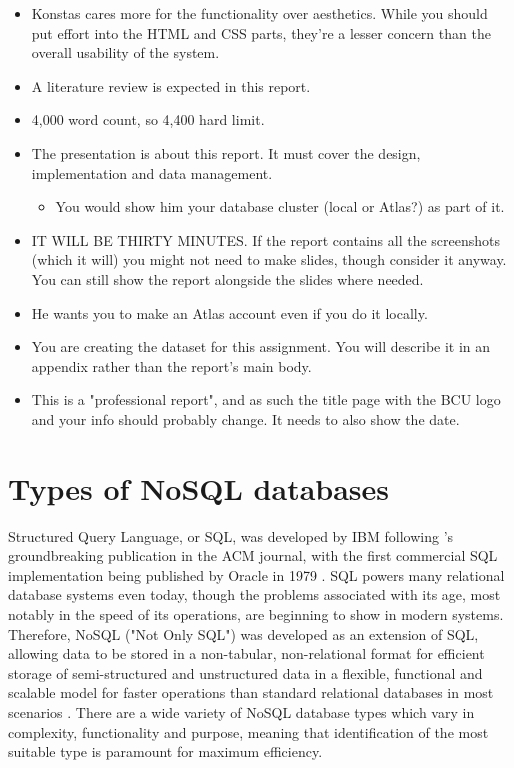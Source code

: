 \documentclass[12pt]{report}
\begin{document}
\begin{itemize}
    \item Konstas cares more for the functionality over aesthetics. While you should put effort into 
    the HTML and CSS parts, they're a lesser concern than the overall usability of the system.
    \item A literature review is expected in this report.
    \item 4,000 word count, so 4,400 hard limit.
    \item The presentation is about this report. It must cover the design, implementation and data management.
    \begin{itemize}
        \item You would show him your database cluster (local or Atlas?) as part of it.
    \end{itemize}
    \item IT WILL BE THIRTY MINUTES. If the report contains all the screenshots (which it will) you might not need 
    to make slides, though consider it anyway. You can still show the report alongside the slides where needed.
    \item He wants you to make an Atlas account even if you do it locally.
    \item You are creating the dataset for this assignment. You will describe it in an appendix rather than 
    the report's main body.
    \item This is a "professional report", and as such the title page with the BCU logo and your info should 
    probably change. It needs to also show the date.
\end{itemize}

\chapter{Types of NoSQL databases}
\noindent Structured Query Language, or SQL, was developed by IBM following \textcite{coddRelationalModelData1970}'s groundbreaking 
publication in the ACM journal, with the first commercial SQL implementation being published by Oracle in 1979 \autocite{oracleHistorySQL}.
SQL powers many relational database systems even today, though the problems associated with its age, most notably in 
the speed of its operations, are beginning to show in modern systems. Therefore, NoSQL ("Not Only SQL") was developed as 
an extension of SQL, allowing data to be stored in a non-tabular, non-relational format for efficient storage of
semi-structured and unstructured data in a flexible, functional and scalable model for faster operations than standard 
relational databases in most scenarios \autocite{googlecloudWhatNoSQLDatabases, awsWhatNoSQLDatabase}. There are a wide variety of NoSQL 
database types which vary in complexity, functionality and purpose, meaning that identification of the most suitable type is paramount 
for maximum efficiency. 
\end{document}
